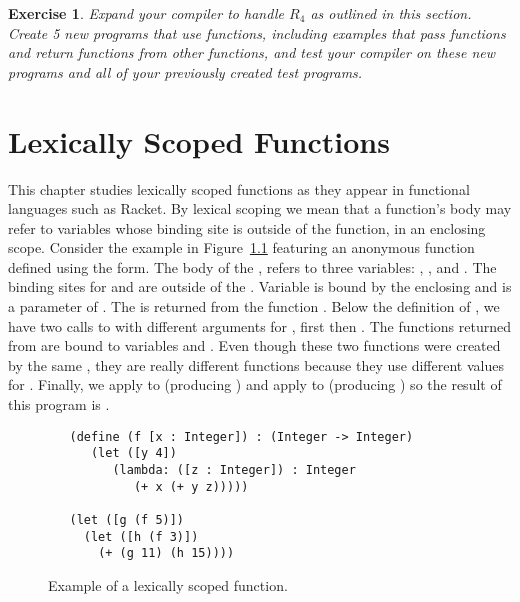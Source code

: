 \documentclass[11pt]{book}
\newtheorem{exercise}[theorem]{Exercise}
\begin{document}
\begin{exercise}\normalfont
Expand your compiler to handle $R_4$ as outlined in this section.
Create 5 new programs that use functions, including examples that pass
functions and return functions from other functions, and test your
compiler on these new programs and all of your previously created test
programs.
\end{exercise}


\chapter{Lexically Scoped Functions}
\label{ch:lambdas}

This chapter studies lexically scoped functions as they appear in
functional languages such as Racket. By lexical scoping we mean that a
function's body may refer to variables whose binding site is outside
of the function, in an enclosing scope.
%
Consider the example in Figure~\ref{fig:lexical-scoping} featuring an
anonymous function defined using the  form.  The body of
the , refers to three variables: , , and
. The binding sites for  and  are outside of
the . Variable  is bound by the enclosing
 and  is a parameter of . The  is
returned from the function . Below the definition of ,
we have two calls to  with different arguments for ,
first  then . The functions returned from  are
bound to variables  and . Even though these two
functions were created by the same , they are really
different functions because they use different values for
. Finally, we apply  to  (producing
) and apply  to  (producing ) so
the result of this program is .

\begin{figure}[btp]
\begin{lstlisting}
   (define (f [x : Integer]) : (Integer -> Integer)
      (let ([y 4])
         (lambda: ([z : Integer]) : Integer
            (+ x (+ y z)))))

   (let ([g (f 5)])
     (let ([h (f 3)])
       (+ (g 11) (h 15))))
\end{lstlisting}
\caption{Example of a lexically scoped function.}
\label{fig:lexical-scoping}
\end{figure}
\end{document}
